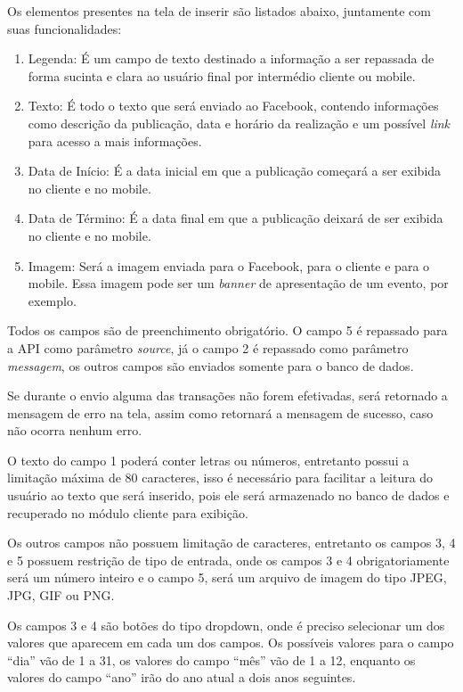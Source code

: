 Os elementos presentes na tela de inserir são listados abaixo, juntamente com suas funcionalidades: 

\begin{enumerate}
   \item Legenda: É um campo de texto destinado a informação a ser repassada de forma sucinta e clara ao usuário final por intermédio cliente ou mobile. 
   \item Texto: É todo o texto que será enviado ao Facebook, contendo informações como descrição da publicação, data e horário da realização e um possível \textit{link} para acesso a mais informações. 
   \item Data de Início: É a data inicial em que a publicação começará a ser exibida no cliente e no mobile.
   \item Data de Término: É a data final em que a publicação deixará de ser exibida no cliente e no mobile.
   \item Imagem: Será a imagem enviada para o Facebook, para o cliente e para o mobile. Essa imagem pode ser um \textit{banner} de apresentação de um evento, por exemplo.
 \end{enumerate}

Todos os campos são de preenchimento obrigatório. O campo 5 é repassado para a API como parâmetro \textit{source}, já o campo 2 é repassado como parâmetro \textit{messagem}, os outros campos são enviados somente para o banco de dados.

Se durante o envio alguma das transações não forem efetivadas, será retornado a mensagem de erro na tela, assim como retornará a mensagem de sucesso, caso não ocorra nenhum erro.

O texto do campo 1 poderá conter letras ou números, entretanto possui a limitação máxima de 80 caracteres, isso é necessário para facilitar a leitura do usuário ao texto que será inserido, pois ele será armazenado no banco de dados e recuperado no módulo cliente para exibição.

Os outros campos não possuem limitação de caracteres, entretanto os campos 3, 4 e 5 possuem restrição de tipo de entrada, onde os campos 3 e 4 obrigatoriamente será um número inteiro e o campo 5, será um arquivo de imagem do tipo JPEG, JPG, GIF ou PNG.

Os campos 3 e 4 são botões do tipo dropdown, onde é preciso selecionar um dos valores que aparecem em cada um dos campos. Os possíveis valores para o campo ``dia'' vão de 1 a 31, os valores do campo ``mês'' vão de 1 a 12, enquanto os valores do campo ``ano'' irão do ano atual a dois anos seguintes.

